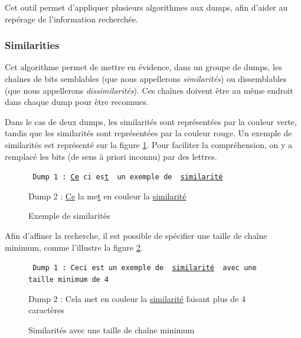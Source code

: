 Cet outil permet d'appliquer plusieurs algorithmes aux dumps, afin d'aider au repérage de l'information recherchée.

\subsubsection{Similarities \cite {ref-vandeursen}} \label{04-similarities}

Cet algorithme permet de mettre en évidence, dans un groupe de dumps, les chaînes de bits semblables (que nous appellerons \emph{similarités}) ou dissemblables (que nous appellerons \emph{dissimilarités}). Ces chaînes doivent être au même endroit dans chaque dump pour être reconnues.

Dans le cas de deux dumps, les similarités sont représentées par la couleur verte, tandis que les similarités sont représentées par la couleur rouge. Un exemple de similarités est représenté sur la figure \ref{04-1-sim_simple}. Pour faciliter la compréhension, on y a remplacé les bits (de sens à priori inconnu) par des lettres.

\begin{figure}[!h]
  \begin{center}
\small{
  {\tt\center
  {Dump 1 : \color{simColor} \uline{Ce}}{\color{dissimColor} ci es}{\color{simColor}\uline{t} }{\color{dissimColor} un exemple de }{\color{simColor} \uline{similarité}}

  {Dump 2 : \color{simColor} \uline{Ce}}{\color{dissimColor} la me}{\color{simColor}\uline{t} }{\color{dissimColor} en couleur la }{\color{simColor} \uline{similarité}}
  }}
  \end{center}
  \caption{Exemple de similarités}
  \label{04-1-sim_simple}
\end{figure}

Afin d'affiner la recherche, il est possible de spécifier une taille de chaîne minimum, comme l'illustre la figure \ref{04-1-sim_taille_min}.

\begin{figure}[!h]
  \begin{center}
\small{
  {\tt
  {Dump 1 : \color{dissimColor} Ceci est un exemple de }{\color{simColor} \uline{similarité} }{\color{dissimColor} avec une taille minimum de 4}

  {Dump 2 : \color{dissimColor} Cela met en couleur la }{\color{simColor} \uline{similarité} }{\color{dissimColor} faisant plus de 4 caractères}
  }}
  \end{center}
  \caption{Similarités avec une taille de chaîne minimum}
  \label{04-1-sim_taille_min}
\end{figure}


